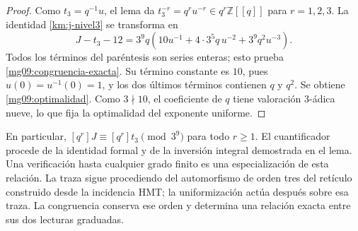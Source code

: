 \begin{proof}
Como \(t_3=q^{-1}u\), el lema da
\(t_3^{-r}=q^ru^{-r}\in q^r\mathbb Z[[q]]\) para
\(r=1,2,3\). La identidad \eqref{km:j-nivel3} se transforma en
\begin{equation}
 J-t_3-12
 =3^9q\left(10u^{-1}+4\cdot3^5q\,u^{-2}
                         +3^9q^2u^{-3}\right).
 \label{mg09:factorizacion}
\end{equation}
Todos los términos del paréntesis son series enteras; esto prueba
\eqref{mg09:congruencia-exacta}. Su término constante es \(10\),
pues \(u(0)=u^{-1}(0)=1\), y los dos últimos términos contienen
\(q\) y \(q^2\). Se obtiene \eqref{mg09:optimalidad}. Como
\(3\nmid10\), el coeficiente de \(q\) tiene valoración
\(3\)-ádica nueve, lo que fija la optimalidad del exponente uniforme.
\end{proof}

En particular, \([q^r]J\equiv[q^r]t_3\pmod{3^9}\) para todo
\(r\geq1\). El cuantificador procede de la identidad formal y de
la inversión integral demostrada en el lema. Una verificación hasta
cualquier grado finito es una especialización de esta relación.
La traza sigue procediendo del automorfismo de orden tres del retículo
construido desde la incidencia HMT; la uniformización actúa después
sobre esa traza. La congruencia conserva ese orden y determina una
relación exacta entre sus dos lecturas graduadas.
